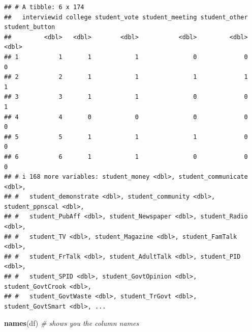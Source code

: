 \documentclass[
]{article}
\newenvironment{Shaded}{\begin{snugshade}}{\end{snugshade}}
\newcommand{\CommentTok}[1]{\textcolor[rgb]{0.56,0.35,0.01}{\textit{#1}}}
\newcommand{\FunctionTok}[1]{\textcolor[rgb]{0.13,0.29,0.53}{\textbf{#1}}}
\newcommand{\NormalTok}[1]{#1}
\begin{document}
\begin{verbatim}
## # A tibble: 6 x 174
##   interviewid college student_vote student_meeting student_other student_button
##         <dbl>   <dbl>        <dbl>           <dbl>         <dbl>          <dbl>
## 1           1       1            1               0             0              0
## 2           2       1            1               1             1              1
## 3           3       1            1               0             0              1
## 4           4       0            0               0             0              0
## 5           5       1            1               1             0              0
## 6           6       1            1               0             0              0
## # i 168 more variables: student_money <dbl>, student_communicate <dbl>,
## #   student_demonstrate <dbl>, student_community <dbl>, student_ppnscal <dbl>,
## #   student_PubAff <dbl>, student_Newspaper <dbl>, student_Radio <dbl>,
## #   student_TV <dbl>, student_Magazine <dbl>, student_FamTalk <dbl>,
## #   student_FrTalk <dbl>, student_AdultTalk <dbl>, student_PID <dbl>,
## #   student_SPID <dbl>, student_GovtOpinion <dbl>, student_GovtCrook <dbl>,
## #   student_GovtWaste <dbl>, student_TrGovt <dbl>, student_GovtSmart <dbl>, ...
\end{verbatim}

\begin{Shaded}
\begin{Highlighting}[]
\FunctionTok{names}\NormalTok{(df)  }\CommentTok{\# shows you the column names }
\end{Highlighting}
\end{Shaded}
\end{document}
